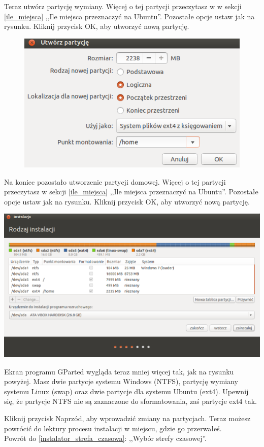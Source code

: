 Teraz utwórz partycję wymiany. Więcej o tej partycji przeczytasz w w sekcji \ref{ile_miejsca} ,,Ile miejsca przeznaczyć na Ubuntu''. Pozostałe opcje ustaw jak na rysunku. Kliknij przycisk \textcolor{ubuntu_orange}{OK}, aby utworzyć nową partycję.
\begin{figure}
                \includegraphics[width=\linewidth]{images/instalator_partycjonowanie_gparted_dodaj_home.png}
\end{figure}
Na koniec pozostało utworzenie partycji domowej. Więcej o tej partycji przeczytasz w sekcji \ref{ile_miejsca} ,,Ile miejsca przeznaczyć na Ubuntu''. Pozostałe opcje ustaw jak na rysunku. Kliknij przycisk \textcolor{ubuntu_orange}{OK}, aby utworzyć nową partycję.
\clearpage
\begin{center}
        \includegraphics[width=\linewidth]{images/instalator_partycjonowanie_gparted4.png}
\end{center}
Ekran programu GParted wygląda teraz mniej więcej tak, jak na rysunku powyżej. Masz dwie partycje systemu Windows (NTFS), partycję wymiany systemu Linux (swap) oraz dwie partycje dla systemu Ubuntu (ext4). Upewnij się, że partycje NTFS \textcolor{ubuntu_orange}{nie} są zaznaczone do sformatowania, zaś partycje ext4 tak.

Kliknij przycisk \textcolor{ubuntu_orange}{Naprzód}, aby wprowadzić zmiany na partycjach. Teraz możesz powrócić do lektury procesu instalacji w miejscu, gdzie go przerwałeś.\\
Powrót do \ref{instalator_strefa_czasowa}: ,,Wybór strefy czasowej''.
\clearpage
